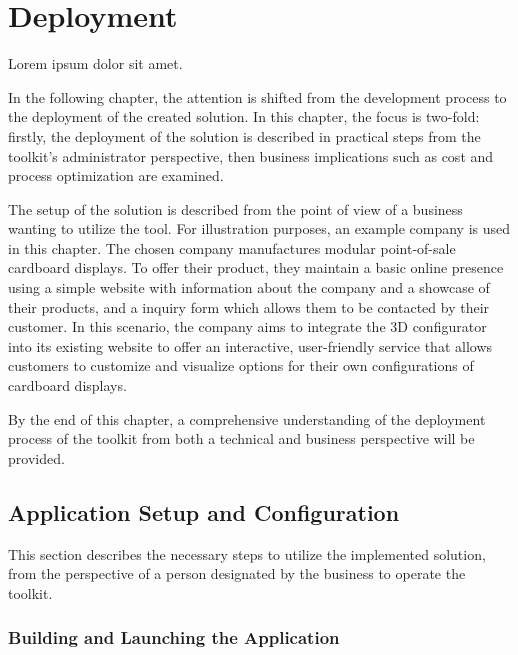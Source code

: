 \chapter{Deployment}

\begin{chapterabstract}
    Lorem ipsum dolor sit amet.
\end{chapterabstract}

In the following chapter, the attention is shifted from the development process to the deployment of the created solution. In this chapter, the focus is two-fold: firstly, the deployment of the solution is described in practical steps from the toolkit's administrator perspective, then business implications such as cost and process optimization are examined.

The setup of the solution is described from the point of view of a business wanting to utilize the tool. For illustration purposes, an example company is used in this chapter. The chosen company manufactures modular point-of-sale cardboard displays. To offer their product, they maintain a basic online presence using a simple website with information about the company and a showcase of their products, and a inquiry form which allows them to be contacted by their customer. In this scenario, the company aims to integrate the 3D configurator into its existing website to offer an interactive, user-friendly service that allows customers to customize and visualize options for their own configurations of cardboard displays.

By the end of this chapter, a comprehensive understanding of the deployment process of the toolkit from both a technical and business perspective will be provided.


\section{Application Setup and Configuration}

This section describes the necessary steps to utilize the implemented solution, from the perspective of a person designated by the business to operate the toolkit.


\subsection{Building and Launching the Application}

